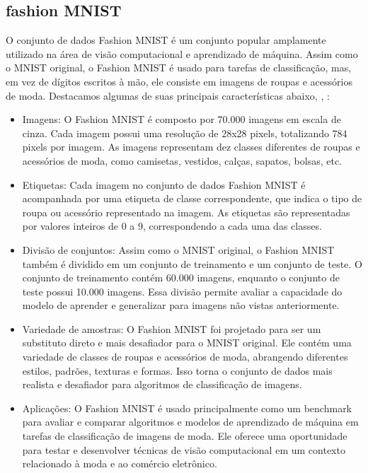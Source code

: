 \documentclass{article}
\begin{document}
\subsection{fashion MNIST}

O conjunto de dados Fashion MNIST é um conjunto popular amplamente utilizado na área de visão computacional e aprendizado de máquina. Assim como o MNIST original, o Fashion MNIST é usado para tarefas de classificação, mas, em vez de dígitos escritos à mão, ele consiste em imagens de roupas e acessórios de moda. Destacamos algumas de suas principais características abaixo, \cite{Xiao2017FashionMNISTAN}, \cite{Olivia}:

\begin{itemize}
    \item Imagens: O Fashion MNIST é composto por 70.000 imagens em escala de cinza. Cada imagem possui uma resolução de 28x28 pixels, totalizando 784 pixels por imagem. As imagens representam dez classes diferentes de roupas e acessórios de moda, como camisetas, vestidos, calças, sapatos, bolsas, etc.
    \item Etiquetas: Cada imagem no conjunto de dados Fashion MNIST é acompanhada por uma etiqueta de classe correspondente, que indica o tipo de roupa ou acessório representado na imagem. As etiquetas são representadas por valores inteiros de 0 a 9, correspondendo a cada uma das classes.
    \item Divisão de conjuntos: Assim como o MNIST original, o Fashion MNIST também é dividido em um conjunto de treinamento e um conjunto de teste. O conjunto de treinamento contém 60.000 imagens, enquanto o conjunto de teste possui 10.000 imagens. Essa divisão permite avaliar a capacidade do modelo de aprender e generalizar para imagens não vistas anteriormente.
    \item Variedade de amostras: O Fashion MNIST foi projetado para ser um substituto direto e mais desafiador para o MNIST original. Ele contém uma variedade de classes de roupas e acessórios de moda, abrangendo diferentes estilos, padrões, texturas e formas. Isso torna o conjunto de dados mais realista e desafiador para algoritmos de classificação de imagens.
    \item Aplicações: O Fashion MNIST é usado principalmente como um benchmark para avaliar e comparar algoritmos e modelos de aprendizado de máquina em tarefas de classificação de imagens de moda. Ele oferece uma oportunidade para testar e desenvolver técnicas de visão computacional em um contexto relacionado à moda e ao comércio eletrônico.
\end{itemize}
\end{document}
